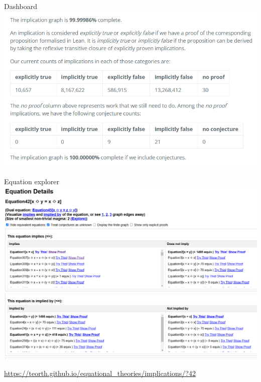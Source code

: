 \documentclass{beamer}
\begin{document}
\begin{frame}{Dashboard}
\includegraphics[width=\textwidth]{dashboard}
\end{frame}


\begin{frame}{Equation explorer}
\includegraphics[width=\textwidth]{equation_explorer}

\scriptsize\url{https://teorth.github.io/equational_theories/implications/?42}
\end{frame}
\end{document}

